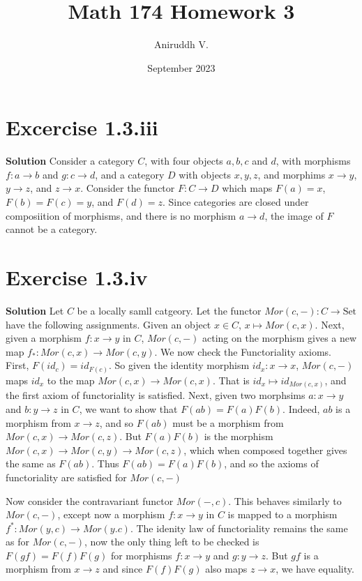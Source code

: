 \documentclass{article}
\title{Math 174 Homework 3}
\author{Aniruddh V.}
\date{September 2023}
\begin{document}
\maketitle

\section{Excercise 1.3.iii}
\textbf{Solution } Consider a category $C$, with four objects $a, b, c$ and $d$, with morphisms $f: a \to b$ and $g: c \to d$, and a category $D$ with objects $x, y, z$, and morphims 
$x \to y$, $y \to z$, and $z \to x$. Consider the functor $F : C \to D$ which maps $F(a) = x$, $F(b) = F(c) = y$, and $F(d) = z$. Since categories are closed under composiition of morphisms,
and there is no morphism $a \to d$, the image of $F$ cannot be a category.

\section{Exercise 1.3.iv}
\textbf{Solution } Let $C$ be a locally samll catgeory. Let the functor $Mor(c, -) : C \to \text{Set}$ have the following assignments. Given an object $x \in C$, $x \mapsto Mor(c, x)$. 
Next, given a morphism $f: x \to y$ in $C$, $Mor(c, -)$ acting on the morphism gives a new map $f_* : Mor(c, x) \to Mor(c, y)$. We now check the Functoriality axioms. First, $F(id_c) = id_{F(c)}$. 
So given the identity morphism $id_x : x \to x$, $Mor(c,  -)$ maps $id_x$ to the map $Mor(c, x) \to Mor(c,x )$. That is $id_x \mapsto id_{Mor(c, x)}$, and the first axiom of functoriality is
satisfied. Next, given two morphsims $a: x \to y$ and $b: y \to z$ in $C$, we want to show that $F(ab) = F(a)F(b)$. Indeed, $ab$ is a morphism from $x \to z$, and so $F(ab)$ must be a morphism from
$Mor(c, x) \to Mor(c,z )$. But $F(a)F(b)$ is the morphism $Mor(c, x) \to Mor(c, y) \to Mor(c,z )$, which when composed together gives the same as $F(ab)$. Thus $F(ab)
 = F(a)F(b)$, and so the axioms of functoriality are satisfied for $Mor(c, -)$

 Now consider the contravariant functor $Mor(-, c)$. This behaves similarly to $Mor(c, -)$, except now a morphism $f: x \to y$ in $C$ is mapped to a morphism $f^* : Mor(y,c ) \to Mor(y. c)$. 
 The idenity law of functoriality remains the same as for $Mor(c, -)$, now the only thing left to be checked is $F(gf) = F(f)F(g)$ for morphisms $f: x \to y$ and $g: y \to z$. But $gf$ is a morphism from $x \to z$
 and since $F(f)F(g)$ also maps $z \to x$, we have equality. 
\end{document}
